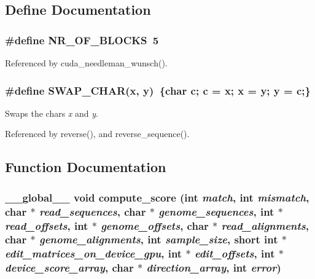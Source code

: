 \subsection{Define Documentation}
\subsubsection[{NR\_\-OF\_\-BLOCKS}]{\setlength{\rightskip}{0pt plus 5cm}\#define NR\_\-OF\_\-BLOCKS~5}\label{cuda-functions_8cu_136296bef301022e13da8023bdb266e3}




Referenced by cuda\_\-needleman\_\-wunsch().
\subsubsection[{SWAP\_\-CHAR}]{\setlength{\rightskip}{0pt plus 5cm}\#define SWAP\_\-CHAR(x, \/  y)~\{char c; c = x; x = y; y = c;\}}\label{cuda-functions_8cu_095f50fa15c6a279dd92d579f21e1cd1}


Swaps the chars {\em x\/} and {\em y\/}. 

Referenced by reverse(), and reverse\_\-sequence().

\subsection{Function Documentation}
\subsubsection[{compute\_\-score}]{\setlength{\rightskip}{0pt plus 5cm}\_\-\_\-global\_\-\_\- void compute\_\-score (int {\em match}, \/  int {\em mismatch}, \/  char $\ast$ {\em read\_\-sequences}, \/  char $\ast$ {\em genome\_\-sequences}, \/  int $\ast$ {\em read\_\-offsets}, \/  int $\ast$ {\em genome\_\-offsets}, \/  char $\ast$ {\em read\_\-alignments}, \/  char $\ast$ {\em genome\_\-alignments}, \/  int {\em sample\_\-size}, \/  short int $\ast$ {\em edit\_\-matrices\_\-on\_\-device\_\-gpu}, \/  int $\ast$ {\em edit\_\-offsets}, \/  int $\ast$ {\em device\_\-score\_\-array}, \/  char $\ast$ {\em direction\_\-array}, \/  int {\em error})}\label{cuda-functions_8cu_109ef3a0d8dfe9814e83e068caf0b618}




